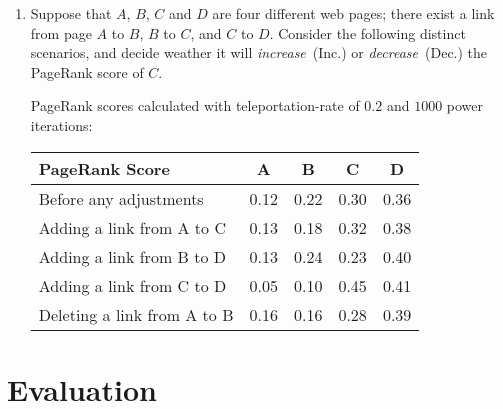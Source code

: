 \documentclass[exam, sectionseven, solution]{acAssignment}
\begin{document}
\begin{enumerate}
    \clearpage
    \item Suppose that $A$, $B$, $C$ and $D$ are four different web pages; there exist a link from page $A$ to $B$, $B$ to $C$, and $C$ to $D$. Consider the following distinct scenarios, and decide weather it will \emph{increase}~(Inc.) or \emph{decrease}~(Dec.) the PageRank score of $C$.
        \begin{acMultipleChoice}
        \end{acMultipleChoice}

    \begin{acSolution}
        \vspace{0.25cm}
        PageRank scores calculated with teleportation-rate of $0.2$ and $1000$ power iterations:
        \begin{center}
            \begin{tabular}{lcccc}
                \toprule
                PageRank Score & A & B & C & D \\
                \midrule
                Before any adjustments      & 0.12 & 0.22 & 0.30 & 0.36 \\
                Adding a link from A to C   & 0.13 & 0.18 & 0.32 & 0.38 \\
                Adding a link from B to D   & 0.13 & 0.24 & 0.23 & 0.40 \\
                Adding a link from C to D   & 0.05 & 0.10 & 0.45 & 0.41 \\
                Deleting a link from A to B & 0.16 & 0.16 & 0.28 & 0.39 \\
                \bottomrule
            \end{tabular}
            \renewcommand*\arraystretch{1}
        \end{center}
    \end{acSolution}
\end{enumerate}


\section{Evaluation}
\end{document}

